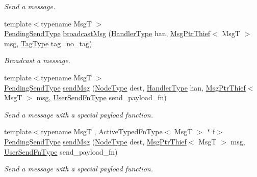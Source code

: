 \begin{DoxyCompactItemize}
\begin{DoxyCompactList}\small\item\em Send a message. \end{DoxyCompactList}\item 
{\footnotesize template$<$typename MsgT $>$ }\\\hyperlink{structvt_1_1messaging_1_1_active_messenger_a3626a6ca76d8ad4ec7c3b47a2c70d3a8}{Pending\+Send\+Type} \hyperlink{group__sendpayload_ga8fd0c564e6c5d0bde3fbfa2e9a9d5ad9}{broadcast\+Msg} (\hyperlink{namespacevt_af64846b57dfcaf104da3ef6967917573}{Handler\+Type} han, \hyperlink{structvt_1_1messaging_1_1_msg_ptr_thief}{Msg\+Ptr\+Thief}$<$ MsgT $>$ msg, \hyperlink{namespacevt_a84ab281dae04a52a4b243d6bf62d0e52}{Tag\+Type} tag=no\+\_\+tag)
\begin{DoxyCompactList}\small\item\em Broadcast a message. \end{DoxyCompactList}\item 
{\footnotesize template$<$typename MsgT $>$ }\\\hyperlink{structvt_1_1messaging_1_1_active_messenger_a3626a6ca76d8ad4ec7c3b47a2c70d3a8}{Pending\+Send\+Type} \hyperlink{group__sendpayload_ga3548fb78b56bcd3f06cdb2fc6239e3c6}{send\+Msg} (\hyperlink{namespacevt_a866da9d0efc19c0a1ce79e9e492f47e2}{Node\+Type} dest, \hyperlink{namespacevt_af64846b57dfcaf104da3ef6967917573}{Handler\+Type} han, \hyperlink{structvt_1_1messaging_1_1_msg_ptr_thief}{Msg\+Ptr\+Thief}$<$ MsgT $>$ msg, \hyperlink{structvt_1_1messaging_1_1_active_messenger_a4b1993ad77436b6ed6c7fd32801c50ed}{User\+Send\+Fn\+Type} send\+\_\+payload\+\_\+fn)
\begin{DoxyCompactList}\small\item\em Send a message with a special payload function. \end{DoxyCompactList}\item 
{\footnotesize template$<$typename MsgT , Active\+Typed\+Fn\+Type$<$ Msg\+T $>$ $\ast$ f$>$ }\\\hyperlink{structvt_1_1messaging_1_1_active_messenger_a3626a6ca76d8ad4ec7c3b47a2c70d3a8}{Pending\+Send\+Type} \hyperlink{group__sendpayload_ga11c4c7dec9f0da88060bacff76fb118d}{send\+Msg} (\hyperlink{namespacevt_a866da9d0efc19c0a1ce79e9e492f47e2}{Node\+Type} dest, \hyperlink{structvt_1_1messaging_1_1_msg_ptr_thief}{Msg\+Ptr\+Thief}$<$ MsgT $>$ msg, \hyperlink{structvt_1_1messaging_1_1_active_messenger_a4b1993ad77436b6ed6c7fd32801c50ed}{User\+Send\+Fn\+Type} send\+\_\+payload\+\_\+fn)
\begin{DoxyCompactList}\small\item\em Send a message with a special payload function. \end{DoxyCompactList}\item 

\end{DoxyCompactItemize}
